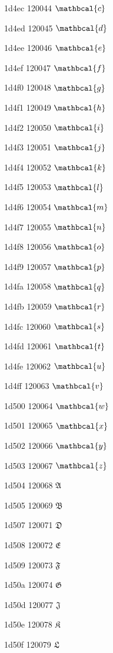 \documentclass[11pt]{article}
\begin{document}
1d4ec 120044 \ensuremath{\mathbcal{c}}

1d4ed 120045 \ensuremath{\mathbcal{d}}

1d4ee 120046 \ensuremath{\mathbcal{e}}

1d4ef 120047 \ensuremath{\mathbcal{f}}

1d4f0 120048 \ensuremath{\mathbcal{g}}

1d4f1 120049 \ensuremath{\mathbcal{h}}

1d4f2 120050 \ensuremath{\mathbcal{i}}

1d4f3 120051 \ensuremath{\mathbcal{j}}

1d4f4 120052 \ensuremath{\mathbcal{k}}

1d4f5 120053 \ensuremath{\mathbcal{l}}

1d4f6 120054 \ensuremath{\mathbcal{m}}

1d4f7 120055 \ensuremath{\mathbcal{n}}

1d4f8 120056 \ensuremath{\mathbcal{o}}

1d4f9 120057 \ensuremath{\mathbcal{p}}

1d4fa 120058 \ensuremath{\mathbcal{q}}

1d4fb 120059 \ensuremath{\mathbcal{r}}

1d4fc 120060 \ensuremath{\mathbcal{s}}

1d4fd 120061 \ensuremath{\mathbcal{t}}

1d4fe 120062 \ensuremath{\mathbcal{u}}

1d4ff 120063 \ensuremath{\mathbcal{v}}

1d500 120064 \ensuremath{\mathbcal{w}}

1d501 120065 \ensuremath{\mathbcal{x}}

1d502 120066 \ensuremath{\mathbcal{y}}

1d503 120067 \ensuremath{\mathbcal{z}}

1d504 120068 \ensuremath{\mathfrak{A}}

1d505 120069 \ensuremath{\mathfrak{B}}

1d507 120071 \ensuremath{\mathfrak{D}}

1d508 120072 \ensuremath{\mathfrak{E}}

1d509 120073 \ensuremath{\mathfrak{F}}

1d50a 120074 \ensuremath{\mathfrak{G}}

1d50d 120077 \ensuremath{\mathfrak{J}}

1d50e 120078 \ensuremath{\mathfrak{K}}

1d50f 120079 \ensuremath{\mathfrak{L}}
\end{document}
